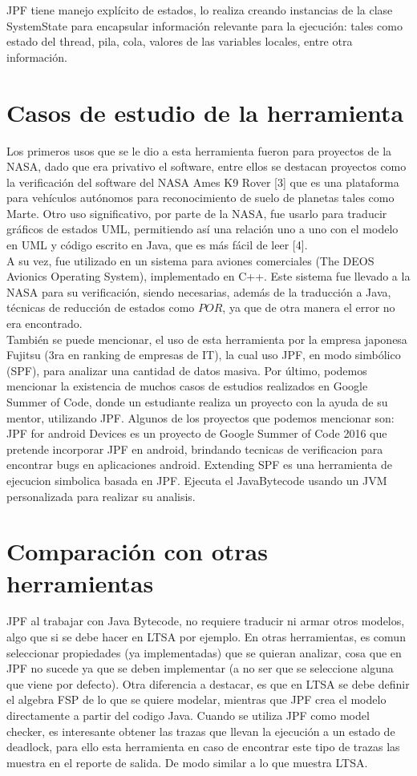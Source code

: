 \documentclass[runningheads]{llncs}
\begin{document}
JPF tiene manejo explícito de estados, lo realiza creando instancias de la clase SystemState para encapsular información relevante para la ejecución: tales como estado del thread, pila, cola, valores de las variables locales, entre otra información.


\section{Casos de estudio de la herramienta}

Los primeros usos que se le dio a esta herramienta fueron para proyectos de la NASA, dado que era privativo el software, entre ellos se destacan proyectos como la verificación del software del NASA Ames K9 Rover [3] que es una plataforma para vehículos autónomos para reconocimiento de suelo de planetas tales como Marte.
Otro uso significativo, por parte de la NASA, fue usarlo para traducir gráficos de estados UML, permitiendo así una relación uno a uno con el modelo en UML y código escrito en Java, que es más fácil de leer [4].\\
A su vez, fue utilizado en un sistema para aviones comerciales (The DEOS Avionics Operating System), implementado en C++. Este sistema fue llevado a la NASA para su verificación, siendo necesarias, además de la traducción a Java, t\'ecnicas de reducci\'on de estados como $POR$, ya que de otra manera el error no era encontrado.\\
También se puede mencionar, el uso de esta herramienta por la empresa japonesa Fujitsu (3ra en ranking de empresas de IT), la cual uso JPF, en modo simbólico (SPF), para analizar una cantidad de datos masiva.
Por último, podemos mencionar la existencia de muchos casos de estudios realizados en Google Summer of Code, donde un estudiante realiza un proyecto con la ayuda de su mentor, utilizando JPF. Algunos de los proyectos que podemos mencionar son: 
JPF for android Devices es un proyecto de Google Summer of Code 2016 que pretende incorporar JPF en android, brindando tecnicas de verificacion para encontrar bugs en aplicaciones android.
Extending SPF es una herramienta de ejecucion simbolica basada en JPF. Ejecuta el JavaBytecode usando un JVM personalizada para realizar su analisis.


\section{Comparaci\'on con otras herramientas}

JPF al trabajar con Java Bytecode, no requiere traducir ni armar otros modelos, algo que si se debe hacer en LTSA por ejemplo. En otras herramientas, es comun seleccionar propiedades (ya implementadas) que se quieran analizar, cosa que en JPF no sucede ya que se deben implementar (a no ser que se seleccione alguna que viene por defecto).
Otra diferencia a destacar, es que en LTSA se debe definir el algebra FSP de lo que se quiere modelar, mientras que JPF crea el modelo directamente a partir del codigo Java.
Cuando se utiliza JPF como model checker, es interesante obtener las trazas que llevan la ejecuci\'on a un estado de deadlock, para ello esta herramienta en caso de encontrar este tipo de trazas las muestra en el reporte de salida. De modo similar a lo que muestra LTSA.
\end{document}
